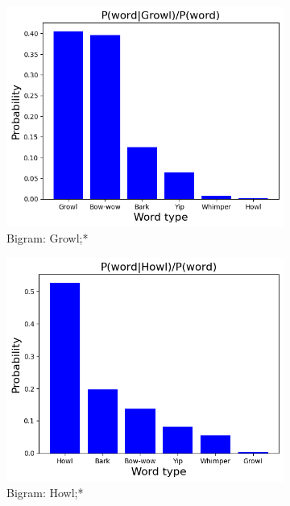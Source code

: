 \begin{figure}[th]
\begin{subfigure}[b]{0.3\textwidth}
	\centering
    	\includegraphics[width=\textwidth]{images/Growl.png}
	\caption{Bigram: Growl;*}
    \end{subfigure}
    \begin{subfigure}[b]{0.3\textwidth}
	\centering
    	\includegraphics[width=\textwidth]{images/Howl.png}
	\caption{Bigram: Howl;*}
    \end{subfigure}
    \begin{subfigure}[b]{0.3\textwidth}
	\centering

\end{subfigure}
\end{figure}
